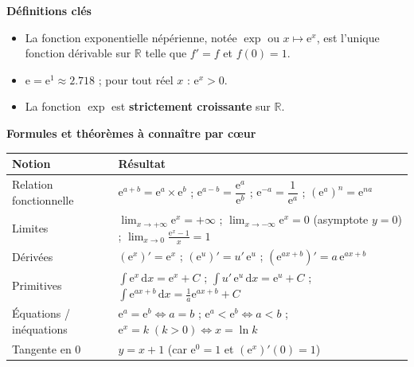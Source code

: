 \documentclass[11pt]{article}
\newcommand{\cle}[1]{{\popxbold\color{popdark}#1}}
\begin{document}
\begin{bilan}
\textbf{Définitions clés}
\begin{itemize}
\item La fonction \cle{exponentielle népérienne}, notée $\exp$ ou $x\mapsto \mathrm{e}^x$, est l'unique fonction dérivable sur $\mathbb{R}$ telle que $f'=f$ et $f(0)=1$.
\item $\mathrm{e}=\mathrm{e}^1\approx \num{2,718}$ ; pour tout réel $x$ : $\mathrm{e}^x>0$.
\item La fonction $\exp$ est \textbf{strictement croissante} sur $\mathbb{R}$.
\end{itemize}

\textbf{Formules et théorèmes à connaître par cœur}
\begin{center}
\begin{tabularx}{\linewidth}{|l|X|}\hline
\rowcolor{popblueL} \textbf{Notion} & \textbf{Résultat} \\ \hline
Relation fonctionnelle & $\mathrm{e}^{a+b}=\mathrm{e}^a\times \mathrm{e}^b$ ; \quad $\mathrm{e}^{a-b}=\dfrac{\mathrm{e}^a}{\mathrm{e}^b}$ ; \quad $\mathrm{e}^{-a}=\dfrac{1}{\mathrm{e}^a}$ ; \quad $(\mathrm{e}^a)^n=\mathrm{e}^{na}$ \\ \hline
Limites & $\displaystyle\lim_{x\to +\infty}\mathrm{e}^x=+\infty$ ; \quad $\displaystyle\lim_{x\to -\infty}\mathrm{e}^x=0$ (asymptote $y=0$) ; \quad $\displaystyle\lim_{x\to 0}\frac{\mathrm{e}^x-1}{x}=1$ \\ \hline
Dérivées & $(\mathrm{e}^x)'=\mathrm{e}^x$ ; \quad $(\mathrm{e}^{u})'=u'\,\mathrm{e}^{u}$ ; \quad $(\mathrm{e}^{ax+b})'=a\,\mathrm{e}^{ax+b}$ \\ \hline
Primitives & $\displaystyle\int \mathrm{e}^x\,\mathrm{d}x=\mathrm{e}^x+C$ ; \quad $\displaystyle\int u'\,\mathrm{e}^{u}\,\mathrm{d}x=\mathrm{e}^{u}+C$ ; \quad $\displaystyle\int \mathrm{e}^{ax+b}\,\mathrm{d}x=\frac{1}{a}\mathrm{e}^{ax+b}+C$ \\ \hline
Équations / inéquations & $\mathrm{e}^a=\mathrm{e}^b \Leftrightarrow a=b$ ; \quad $\mathrm{e}^a<\mathrm{e}^b \Leftrightarrow a<b$ ; \quad $\mathrm{e}^x=k \;(k>0) \Leftrightarrow x=\ln k$ \\ \hline
Tangente en 0 & $y=x+1$ (car $\mathrm{e}^0=1$ et $(\mathrm{e}^x)'(0)=1$) \\ \hline
\end{tabularx}
\end{center}


\end{bilan}
\end{document}
